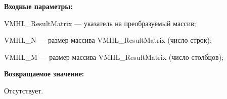\textbf{Входные параметры:}

 VMHL\_ResultMatrix --- указатель на преобразуемый массив;
 
 VMHL\_N --- размер массива VMHL\_ResultMatrix (число строк);
 
 VMHL\_M --- размер массива VMHL\_ResultMatrix (число столбцов);

\textbf{Возвращаемое значение:}

Отсутствует.